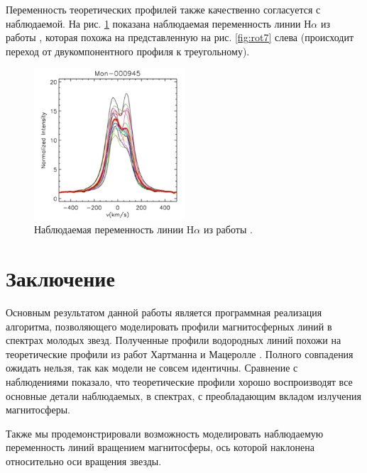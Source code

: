 \documentclass[12pt]{article}
\begin{document}
\FloatBarrier

Переменность теоретических профилей также качественно согласуется с наблюдаемой. На рис. \ref{fig:compvar} показана наблюдаемая переменность линии Н$\alpha$ из работы \cite{sousa16}, которая похожа на представленную на рис. \ref{fig:rot7} слева (происходит переход от двукомпонентного профиля к треугольному).

\begin{figure}[h]
\centering
\includegraphics[width=0.5\textwidth]{profilevar.png}
\caption{Наблюдаемая переменность линии H$\alpha$ из работы \cite{sousa16}.}
\label{fig:compvar}
\end{figure} 

\FloatBarrier

\section{Заключение}

Основным результатом данной работы является программная реализация алгоритма, позволяющего моделировать профили магнитосферных линий в спектрах молодых звезд. 
Полученные профили водородных линий похожи на теоретические профили из работ Хартманна \cite{hartmann94} и Мацеролле \cite{muzerolle01}. Полного совпадения ожидать нельзя, так как модели не совсем идентичны. Сравнение с наблюдениями показало, что теоретические профили хорошо воспроизводят все основные детали наблюдаемых, в спектрах, с преобладающим вкладом излучения магнитосферы. 

Также мы продемонстрировали возможность моделировать наблюдаемую переменность линий вращением магнитосферы, ось которой наклонена относительно оси вращения звезды.
\end{document}
